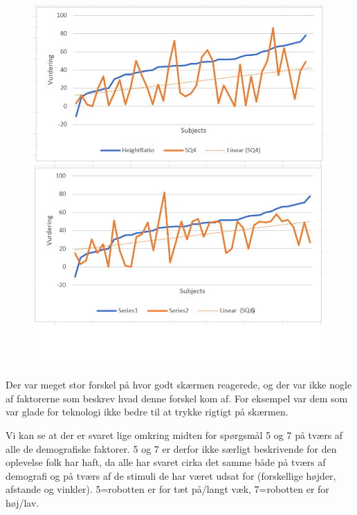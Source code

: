\begin{figure}[H]
\centering
\includegraphics[width=\textwidth]{Figure/DatabehandlingSkalaer/Demografi/HeightRatio4_6.png}
\caption{}
\label{fig:heightRatio4_6}
\end{figure}
\noindent


Der var meget stor forskel på hvor godt skærmen reagerede, og der var ikke nogle af faktorerne som beskrev hvad denne forskel kom af. For eksempel var dem som var glade for teknologi ikke bedre til at trykke rigtigt på skærmen.

Vi kan se at der er svaret lige omkring midten for spørgsmål 5 og 7 på tværs af alle de demografiske faktorer. 5 og 7 er derfor ikke særligt beskrivende for den oplevelse folk har haft, da alle har svaret cirka det samme både på tværs af demografi og på tværs af de stimuli de har været udsat for (forskellige højder, afstande og vinkler). 5=robotten er for tæt på/langt væk, 7=robotten er for høj/lav.